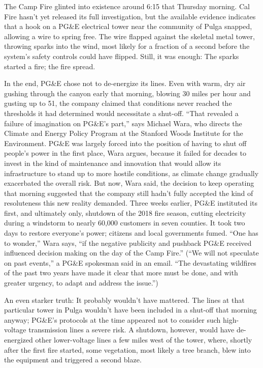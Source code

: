 The Camp Fire glinted into existence around 6:15 that Thursday morning.
Cal Fire hasn't yet released its full investigation, but the available
evidence indicates that a hook on a PG\&E electrical tower near the
community of Pulga snapped, allowing a wire to spring free. The wire
flapped against the skeletal metal tower, throwing sparks into the wind,
most likely for a fraction of a second before the system's safety
controls could have flipped. Still, it was enough: The sparks started a
fire; the fire spread.

In the end, PG\&E chose not to de-energize its lines. Even with warm,
dry air gushing through the canyon early that morning, blowing 30 miles
per hour and gusting up to 51, the company claimed that conditions never
reached the thresholds it had determined would necessitate a shut-off.
``That revealed a failure of imagination on PG\&E's part,'' says Michael
Wara, who directs the Climate and Energy Policy Program at the Stanford
Woods Institute for the Environment. PG\&E was largely forced into the
position of having to shut off people's power in the first place, Wara
argues, because it failed for decades to invest in the kind of
maintenance and innovation that would allow its infrastructure to stand
up to more hostile conditions, as climate change gradually exacerbated
the overall risk. But now, Wara said, the decision to keep operating
that morning suggested that the company still hadn't fully accepted the
kind of resoluteness this new reality demanded. Three weeks earlier,
PG\&E instituted its first, and ultimately only, shutdown of the 2018
fire season, cutting electricity during a windstorm to nearly 60,000
customers in seven counties. It took two days to restore everyone's
power; citizens and local governments fumed. ``One has to wonder,'' Wara
says, ``if the negative publicity and pushback PG\&E received influenced
decision making on the day of the Camp Fire.'' (``We will not speculate
on past events,'' a PG\&E spokesman said in an email. ``The devastating
wildfires of the past two years have made it clear that more must be
done, and with greater urgency, to adapt and address the issue.'')

An even starker truth: It probably wouldn't have mattered. The lines at
that particular tower in Pulga wouldn't have been included in a shut-off
that morning anyway; PG\&E's protocols at the time appeared not to
consider such high-voltage transmission lines a severe risk. A shutdown,
however, would have de-energized other lower-voltage lines a few miles
west of the tower, where, shortly after the first fire started, some
vegetation, most likely a tree branch, blew into the equipment and
triggered a second blaze.


